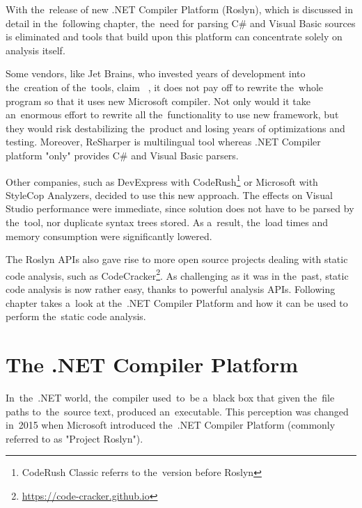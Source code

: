 \documentclass[
  digital, %
  table,   %
  lof,     %
  lot,     %
  oneside,
]{fithesis3}
\begin{document}
With the~release of new .NET Compiler Platform (Roslyn), which is discussed in detail in the~following chapter, the~need for parsing C\# and Visual Basic sources is eliminated and tools that build upon this platform can concentrate solely on analysis itself.

Some vendors, like Jet Brains, who invested years of development into the~creation of the~tools, claim ~\cite{resharper-and-roslyn-qa}, it does not pay off to rewrite the~whole program so that it uses new Microsoft compiler. Not only would it take an~enormous effort to rewrite all the~functionality to use new framework, but they would risk destabilizing the~product and losing years of optimizations and testing. Moreover, ReSharper is multilingual tool whereas .NET Compiler platform "only" provides C\# and Visual Basic parsers.

Other companies, such as DevExpress with CodeRush\footnote{CodeRush Classic referrs to the~version before Roslyn} or Microsoft with StyleCop Analyzers, decided to use this new approach. The effects on Visual Studio performance were immediate, since solution does not have to be parsed by the~tool, nor duplicate syntax trees stored. As a~result, the~load times and memory consumption were significantly lowered.

The Roslyn APIs also gave rise to more open source projects dealing with static code analysis, such as CodeCracker\footnote{\url{https://code-cracker.github.io}}. As challenging as it was in the~past, static code analysis is now rather easy, thanks to powerful analysis APIs. Following chapter takes a~look at the~.NET Compiler Platform and how it can be used to perform the~static code analysis.

\chapter{The .NET Compiler Platform}
In~the~.NET world, the~compiler used~to~be a~black box that given the~file paths to~the~source text, produced an~executable. This perception was changed in~2015 when Microsoft introduced the~.NET Compiler Platform (commonly referred to as "Project Roslyn").  

\end{document}
